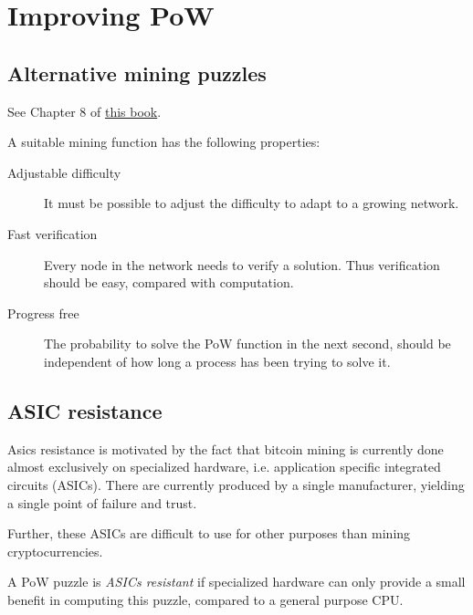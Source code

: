
\section{Improving PoW}



\subsection{Alternative mining puzzles}
See Chapter 8 of \href{https://d28rh4a8wq0iu5.cloudfront.net/bitcointech/readings/princeton_bitcoin_book.pdf}{this book}.

\begin{definition}
A suitable mining function has the following properties:
\begin{description}
	\item[Adjustable difficulty] It must be possible to adjust the difficulty to adapt to a growing network.
	\item[Fast verification] Every node in the network needs to verify a solution. Thus verification should be easy, compared with computation.
	\item[Progress free] The probability to solve the PoW function in the next second, should be independent of how long a process has been trying to solve it.
\end{description}
\end{definition}


\subsection{ASIC resistance}
\label{sec:asic-resistance}
Asics resistance is motivated by the fact that bitcoin mining is currently done almost exclusively on specialized hardware, i.e. application specific integrated circuits (ASICs). There are currently produced by a single manufacturer, yielding a single point of failure and trust. 

Further, these ASICs are difficult to use for other purposes than mining cryptocurrencies.

\begin{definition}A PoW puzzle is \emph{ASICs resistant}
if specialized hardware can only provide a small benefit in computing this puzzle, compared to a general purpose CPU.
\end{definition}

